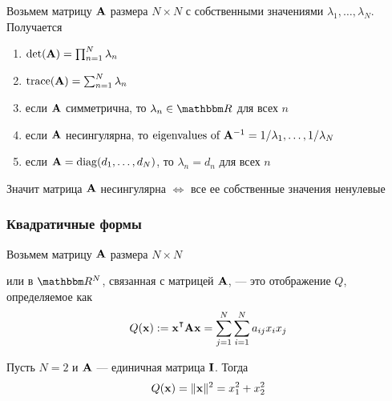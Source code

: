 \begin{frame}

     \vspace{2em}
    \Fact{\eqref{ET-fa:eiprop}} 
    Возьмем матрицу $\mathbf A$ размера $N \times N$ с собственными значениями 
    $\lambda_1, \ldots, \lambda_N$. Получается
    \begin{enumerate}
            \vspace{-0.6em}
        \item $\det(\mathbf A) = \prod_{n=1}^N \lambda_n$
            \vspace{0.4em}
        \item $\operatorname{trace}(\mathbf A) = \sum_{n=1}^N \lambda_n$
            \vspace{0.4em}
        \item если $\mathbf A$ симметрична, то $\lambda_n \in \RR$ для всех $n$
            \vspace{0.4em}
        \item если $\mathbf A$ несингулярна, то $\text{eigenvalues of } \mathbf A^{-1}
                = 1/\lambda_1, \ldots, 1/\lambda_N$
            \vspace{0.4em}
        \item если $\mathbf A = \operatorname{diag}(d_1, \ldots, d_N)$, то $\lambda_n = d_n$ для всех $n$
    \end{enumerate}

    \vspace{0.8em}
    Значит матрица $\mathbf A$ несингулярна $\iff$ все ее собственные значения ненулевые
    
\end{frame}


\begin{frame}\frametitle{Квадратичные формы}

     \vspace{2em}
    Возьмем матрицу $\mathbf A$ размера $N \times N$ 
    
     или  в $\RR^N$, связанная с матрицей $\mathbf A$, --- это отображение $Q$, определяемое как
    \begin{equation*}
        Q(\boldx) := \boldx^\T \boldA \boldx = \sum_{j=1}^N \sum_{i=1}^N a_{ij} x_i x_j
    \end{equation*}
    
    \vspace{.7em}
    \Eg Пусть $N = 2$ и $\mathbf A$ --- единичная матрица $\mathbf I$. Тогда
    \begin{equation*}
        Q({\mathbf x}) = \| {\mathbf x} \|^2 = x_1^2 + x_2^2
    \end{equation*}
    
\end{frame}

